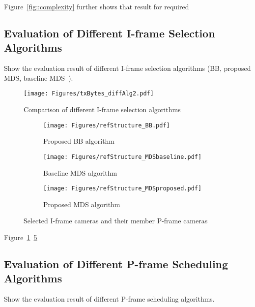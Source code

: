 Figure~\ref{fig::complexity} further shows that result for required

\subsection{Evaluation of Different I-frame Selection Algorithms}
{\color{red}Show the evaluation result of different I-frame selection algorithms (BB, proposed MDS, baseline MDS~\cite{MWDS_baseline}).}
%
\begin{figure}
\begin{center}
\texttt{[image: Figures/txBytes\_diffAlg2.pdf]}
\caption{\label{fig::txBytes_diffAlg} Comparison of different I-frame selection algorithms}
\end{center}
\end{figure}
%
\begin{figure}
\begin{center}
%
\begin{subfigure}[b]{\columnwidth}
\texttt{[image: Figures/refStructure\_BB.pdf]}
\caption{\label{fig::refStructure_BB} Proposed BB algorithm}
\end{subfigure}
%
\begin{subfigure}[b]{\columnwidth}
\texttt{[image: Figures/refStructure\_MDSbaseline.pdf]}
\caption{\label{fig::refStructure_MDSbaseline} Baseline MDS algorithm}
\end{subfigure}
%
\begin{subfigure}[b]{\columnwidth}
\texttt{[image: Figures/refStructure\_MDSproposed.pdf]}
\caption{\label{fig::refStructure_MDSproposed} Proposed MDS algorithm}
\end{subfigure}
%
\caption{\label{fig::refStructure_threeAlgs} Selected I-frame cameras and their member P-frame cameras}
\end{center}
\end{figure}
Figure~\ref{fig::txBytes_diffAlg}~\ref{fig::refStructure_threeAlgs}

%
\subsection{Evaluation of Different P-frame Scheduling Algorithms}
{\color{red}Show the evaluation result of different P-frame scheduling algorithms.}


